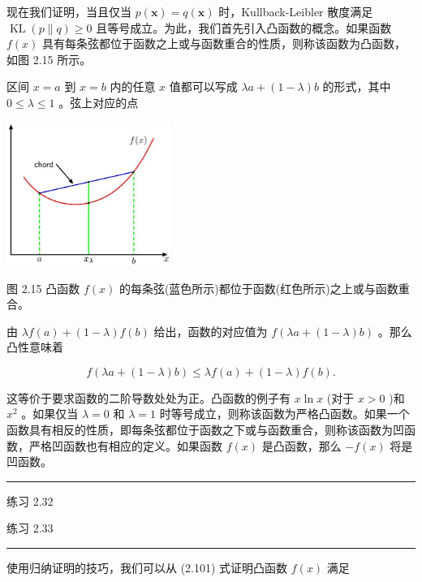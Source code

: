 \documentclass[10pt]{report}
\newcommand{\HRule}{\begin{center}\rule{0.9\linewidth}{0.2mm}\end{center}}
\begin{document}
现在我们证明，当且仅当 \(p\left( \mathbf{x}\right)  = q\left( \mathbf{x}\right)\) 时，Kullback-Leibler 散度满足 \(\operatorname{KL}\left( {p\parallel q}\right)  \geq  0\) 且等号成立。为此，我们首先引入凸函数的概念。如果函数 \(f\left( x\right)\) 具有每条弦都位于函数之上或与函数重合的性质，则称该函数为凸函数，如图 2.15 所示。

区间 \(x = a\) 到 \(x = b\) 内的任意 \(x\) 值都可以写成 \({\lambda a} + \left( {1 - \lambda }\right) b\) 的形式，其中 \(0 \leq  \lambda  \leq  1\) 。弦上对应的点

\begin{center}
\includegraphics[max width=0.4\textwidth]{images/0194e279-9b28-703a-88f4-c3ac21e2010d_71_1002_349_543_475_0.jpg}
\end{center}
\hspace*{3em} 

图 2.15 凸函数 \(f\left( x\right)\) 的每条弦(蓝色所示)都位于函数(红色所示)之上或与函数重合。

由 \({\lambda f}\left( a\right)  + \left( {1 - \lambda }\right) f\left( b\right)\) 给出，函数的对应值为 \(f\left( {{\lambda a} + \left( {1 - \lambda }\right) b}\right)\) 。那么凸性意味着

\[
f\left( {{\lambda a} + \left( {1 - \lambda }\right) b}\right)  \leq  {\lambda f}\left( a\right)  + \left( {1 - \lambda }\right) f\left( b\right) . \tag{2.101}
\]

这等价于要求函数的二阶导数处处为正。凸函数的例子有 \(x\ln x\) (对于 \(x > 0\) )和 \({x}^{2}\) 。如果仅当 \(\lambda  = 0\) 和 \(\lambda  = 1\) 时等号成立，则称该函数为严格凸函数。如果一个函数具有相反的性质，即每条弦都位于函数之下或与函数重合，则称该函数为凹函数，严格凹函数也有相应的定义。如果函数 \(f\left( x\right)\) 是凸函数，那么 \(- f\left( x\right)\) 将是凹函数。

\HRule

练习 2.32

练习 2.33

\HRule

使用归纳证明的技巧，我们可以从 (2.101) 式证明凸函数 \(f\left( x\right)\) 满足
\end{document}
